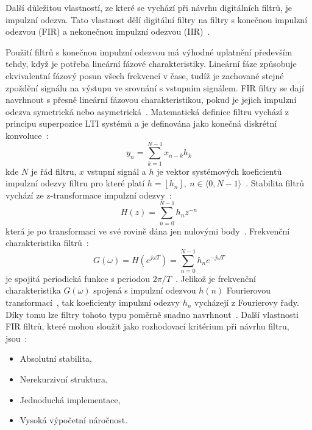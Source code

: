 Další důležitou vlastností, ze které se vychází při návrhu digitálních filtrů,
je impulzní odezva. Tato vlastnost dělí digitální filtry na filtry s konečnou
impulzní odezvou (FIR) a nekonečnou impulzní odezvou (IIR)~\cite{Skop1994}.

Použití filtrů s konečnou impulzní odezvou má výhodné uplatnění především tehdy,
když je potřeba lineární fázové charakteristiky. Lineární fáze způsobuje
ekvivalentní fázový posun všech frekvencí v čase, tudíž je zachované stejné
zpoždění signálu na výstupu ve srovnání s vstupním signálem. FIR filtry se dají
navrhnout s přesně lineární fázovou charakteristikou, pokud je jejich impulzní
odezva symetrická nebo asymetrická~\cite{Prchal2000}. Matematická definice
filtru vychází z principu superpozice LTI systémů a je definována jako konečná
diskrétní konvoluce~\cite{Jan2002}:
\begin{equation}
	\label{eq:conv_fir}
	y_n = \sum_{k=1}^{N-1} x_{n-k} h_k
\end{equation}
kde $N$ je řád filtru, $x$ vstupní signál a $h$ je vektor systémových koeficientů
impulzní odezvy filtru pro které platí $h = [h_n],~n \in \langle 0,N-1
\rangle$~\cite{Jan2002}. Stabilita filtrů vychází ze z-transformace impulzní
odezvy~\cite{Jan2002}:
\begin{equation}
	\label{eq:transfer_fir}
	H(z) = \sum_{n=0}^{N-1} h_n z^{-n}
\end{equation}
která je po transformaci ve své rovině dána jen nulovými body~\cite{Jan2002}.
Frekvenční charakteristika filtrů~\cite{Jan2002}:
\begin{equation}
	\label{eq:freq_fir}
	G(\omega) = H(e^{j \omega T}) = \sum_{n=0}^{N-1} h_n e^{-j \omega T}
\end{equation}
je spojitá periodická funkce s periodou $2\pi/T$~\cite{Jan2002}. Jelikož je
frekvenční charakteristika $G(\omega)$ spojená s impulzní odezvou
$h(n)$ Fourierovou transformací~\cite{Prchal2000}, tak koeficienty impulzní
odezvy $h_n$ vycházejí z Fourierovy řady. Díky tomu lze filtry tohoto typu
poměrně snadno navrhnout~\cite{Jan2002}. Další vlastnosti FIR filtrů, které
mohou sloužit jako rozhodovací kritérium při návrhu filtru,
jsou~\cite{Prchal2000}:
\begin{itemize}[noitemsep]
	\item Absolutní stabilita,
	\item Nerekurzivní struktura,
	\item Jednoduchá implementace,
	\item Vysoká výpočetní náročnost.
\end{itemize}

